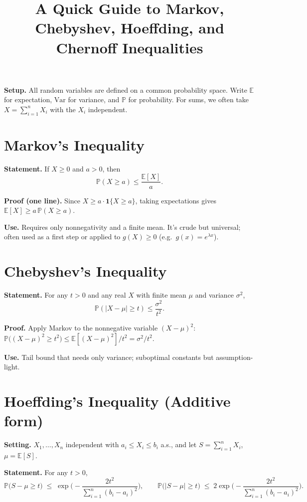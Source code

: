 \documentclass[11pt]{article}
\title{A Quick Guide to Markov, Chebyshev, Hoeffding, and Chernoff Inequalities}
\author{}
\date{}
\begin{document}
\maketitle

\textbf{Setup.} All random variables are defined on a common probability space.
Write $\mathbb{E}$ for expectation, $\mathrm{Var}$ for variance, and
$\mathbb{P}$ for probability. For sums, we often take $X=\sum_{i=1}^n X_i$ with the $X_i$
independent.

\section{Markov's Inequality}
\textbf{Statement.} If $X\ge 0$ and $a>0$, then
\[
		\mathbb{P}(X \ge a) \le \frac{\mathbb{E}[X]}{a}.
\]

\textbf{Proof (one line).} Since $X\ge a\cdot \mathbf{1}\{X\ge a\}$,
taking expectations gives $\mathbb{E}[X]\ge a\,\mathbb{P}(X\ge a)$.

\textbf{Use.} Requires only nonnegativity and a finite mean. It’s crude but universal;
often used as a first step or applied to $g(X)\ge 0$ (e.g.\ $g(x)=e^{\lambda x}$).

\section{Chebyshev's Inequality}
\textbf{Statement.} For any $t>0$ and any real $X$ with finite mean $\mu$ and variance $\sigma^2$,
\[
		\mathbb{P}(|X-\mu|\ge t)\le \frac{\sigma^2}{t^2}.
\]

\textbf{Proof.} Apply Markov to the nonnegative variable $(X-\mu)^2$:
$\mathbb{P}\big((X-\mu)^2\ge t^2\big)\le \mathbb{E}[(X-\mu)^2]/t^2=\sigma^2/t^2$.

\textbf{Use.} Tail bound that needs only variance; suboptimal constants but assumption-light.

\section{Hoeffding's Inequality (Additive form)}
\textbf{Setting.} $X_1,\dots,X_n$ independent with $a_i\le X_i\le b_i$ a.s., and let
$S=\sum_{i=1}^n X_i$, $\mu=\mathbb{E}[S]$.

\textbf{Statement.} For any $t>0$,
\[
		\mathbb{P}\big(S-\mu \ge t\big) \;\le\; \exp\!\Big(-\frac{2t^2}{\sum_{i=1}^n (b_i-a_i)^2}\Big),
		\qquad
		\mathbb{P}\big(|S-\mu| \ge t\big) \;\le\; 2\exp\!\Big(-\frac{2t^2}{\sum_{i=1}^n (b_i-a_i)^2}\Big).
\]
\end{document}
